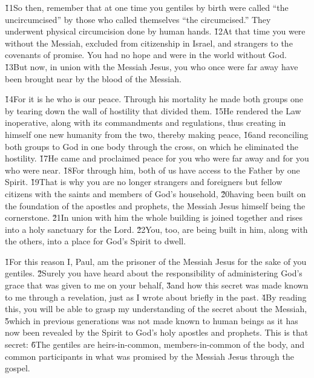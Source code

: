 \v{11}So then, remember that at one time you gentiles by birth were called ``the uncircumcised'' by those who called themselves ``the circumcised.'' They underwent physical circumcision done by human hands. \v{12}At that time you were without the Messiah, excluded from citizenship in Israel, and strangers to the covenants of promise. You had no hope and were in the world without God. \v{13}But now, in union with the Messiah Jesus, you who once were far away have been brought near by the blood of the Messiah.

\v{14}For it is he who is our peace. Through his mortality he made both groups one by tearing down the wall of hostility that divided them. \v{15}He rendered the Law inoperative, along with its commandments and regulations, thus creating in himself one new humanity from the two, thereby making peace, \v{16}and reconciling both groups to God in one body through the cross, on which he eliminated the hostility. \v{17}He came and proclaimed peace for you who were far away and for you who were near. \v{18}For through him, both of us have access to the Father by one Spirit. \v{19}That is why you are no longer strangers and foreigners but fellow citizens with the saints and members of God's household, \v{20}having been built on the foundation of the apostles and prophets, the Messiah Jesus himself being the cornerstone. \v{21}In union with him the whole building is joined together and rises into a holy sanctuary for the Lord. \v{22}You, too, are being built in him, along with the others, into a place for God's Spirit to dwell.

\v{1}For this reason I, Paul, am the prisoner of the Messiah Jesus for the sake of you gentiles. \v{2}Surely you have heard about the responsibility of administering God's grace that was given to me on your behalf, \v{3}and how this secret was made known to me through a revelation, just as I wrote about briefly in the past. \v{4}By reading this, you will be able to grasp my understanding of the secret about the Messiah, \v{5}which in previous generations was not made known to human beings as it has now been revealed by the Spirit to God's holy apostles and prophets. This is that secret: \v{6}The gentiles are heirs-in-common, members-in-common of the body, and common participants in what was promised by the Messiah Jesus through the gospel.

